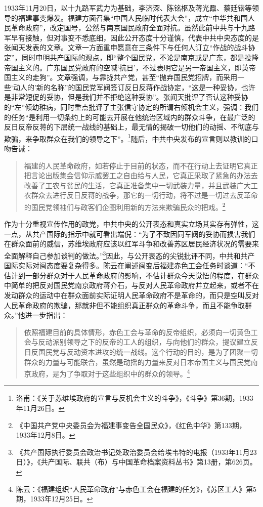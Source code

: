 1933年11月20日，以十九路军武力为基础，李济深、陈铭枢及蒋光鼐、蔡廷锴等领导的福建事变爆发。福建方面召集“中国人民临时代表大会”，成立“中华共和国人民革命政府”，改定国号，公然与南京国民政府全面对抗。虽然此前中共与十九路军早有接触，但对事变不悉底细，因此公开态度十分谨慎，代表中共中央态度的是张闻天发表的文章。文章一方面重申愿意在三条件下与任何人订立“作战的战斗协定”，同时申明共产国际的观点，即“整个国民党，不论是南京或是广东，都是投降帝国主义的。广东国民党政府的空喊‘抗日’，不过表明它是另一帝国主义，即英帝国主义的走狗”。文章强调，与靠拢共产党，甚至“抛弃国民党招牌，而采用一些‘动人的’新的名称”的国民党军阀签订反日反蒋作战协定，“这是一种妥协，也许是非常短促的妥协，但是我们并不拒绝这种妥协”。张闻天批评了否认这种妥协的“左”倾幼稚病，同时重点批评了主张信守协定的所谓右倾机会主义，强调：我们的任务“是利用一切条约上的可能去开展在他统治区域内的群众斗争，在最广泛的反日反帝反蒋的下层统一战线的基础上，最无情的揭破一切他们的动摇、不彻底与欺骗，来争取群众在我们的领导之下”。\footnote{洛甫：《关于苏维埃政府的宣言与反机会主义的斗争》，《斗争》第36期，1933年11月26日。}随后，中共中央发布的宣言则以教训的口吻告诫：

\begin{quote}

福建的人民革命政府，如若停止于目前的状态，而不在行动上去证明它真正把言论出版集会信仰示威罢工之自由给与人民，它真正采取了紧急的办法去改善了工农与贫民的生活，它真正准备集中一切武装力量，并且武装广大工农群众去进行反日反蒋的战争，那它的一切行动，将不过是一切过去反革命的国民党领袖们与政客们企图利用新的方法来欺骗民众的把戏。\footnote{《中国共产党中央委员会为福建事变告全国民众》，《红色中华》第133期，1933年12月8日。}
\end{quote}


作为十分重视宣传作用的政党，中共中央的公开表态和真实立场其实存有弹性，这一点，从共产国际的指示中就可看出端倪：“为了不致因同军阀的妥协而损害我们在群众面前的威信，苏维埃政府应该以红军斗争和改善苏区居民经济状况的需要来全面解释自己参加谈判的做法。”\footnote{《共产国际执行委员会政治书记处政治委员会给埃韦特的电报（1933年11月23日）》，《共产国际、联共（布）与中国革命档案资料丛书》第13册，第626页。}因此，与公开表态的尖锐批评不同，中共和共产国际实际对闽态度要复杂得多。陈云在阐述闽变后福建赤色工会任务时谈道：“不估计到一部分群众对于人民革命政府的影响，不估计群众今天觉悟的程度，在群众中简单的把反对国民党南京政府蒋介石，与反对人民革命政府并立起来，或者不在发动群众的运动中在群众面前实际证明人民革命政府不是革命的，而只是空叫反对人民革命政府的欺骗，那就非但不能组织真正群众的革命斗争，而且不能争取群众。”他进一步指出：

\begin{quote}

依照福建目前的具体情形，赤色工会与革命的反帝组织，必须向一切黄色工会与反动派别领导之下的反帝的工人的组织，与向他们的群众，提议建立反日反国民党与反动资本进攻的统一战线。这个行动的目的，是为了团聚一切群众的力量与可能联合，虽然是动摇的力量来反对日本帝国主义与国民党南京政府，是为了争取对于这些组织中的群众的领导。\footnote{陈云：《福建组织“人民革命政府”与赤色工会在福建的任务》，《苏区工人》第5期，1933年12月25日。}
\end{quote}


